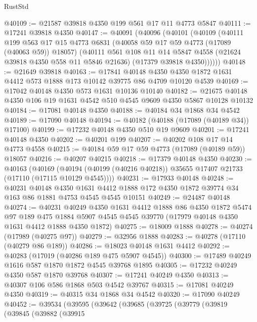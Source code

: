 \begin{lexlean}{RustStd}
\begin{coremodule}
@40109 := @21587 @39818 @4350 @199 @561 @17 @11 @4773 @5847
@40111 := @17241 @39818 @4350
@40147 := @40091
    (@40096
      (@40101
        (@40109
          (@40111
            @199
            @563
            @17
            @15
            @4773
            @6831
            (@40058 @59 @17 @59 @4773 (@17089 (@40063 @59)) @18057)
            (@40111
              @561
              @108
              @11
              @14
              @5847
              @4558
              (@21624 @39818 @4350 @558 @11 @5846 @21636)
              (@17379 @39818 @4350))))))
@40148 := @21649 @39818
@40163 := @17841
    @40148
    @4350
    @4350
    @1872
    @1631
    @4412
    @573
    @1888
    @173
    @10142
    @39775
    @86
    @4709
    @10120
    @4539
@40169 := @17042 @40148 @4350 @573 @1631 @10136 @10140
@40182 := @21675 @40148 @4350 @106 @19 @1631 @4542 @510 @4545 @9609 @4350 @5867 @10128 @10132
@40184 := @17081 @40148 @4350
@40188 := @40184 @34 @1868 @34 @4542
@40189 := @17090 @40148
@40194 := @40182 (@40188 (@17089 (@40189 @34)) @17100)
@40199 := @17232 @40148 @4350 @510 @19 @9609
@40201 := @17241 @40148 @4350
@40202 := @40201 @199
@40207 := @40202 @108 @17 @14 @4773 @4558
@40215 := @40184 @59 @17 @59 @4773 (@17089 (@40189 @59)) @18057
@40216 := @40207 @40215
@40218 := @17379 @40148 @4350
@40230 := @40163
    (@40169 (@40194 (@40199 (@40216 @40218)) @35655 @17407 @21733 (@17110 (@17115 @10129 @4545))))
@40231 := @17933 @40148
@40248 := @40231
    @40148
    @4350
    @1631
    @4412
    @1888
    @172
    @4350
    @1872
    @39774
    @34
    @163
    @86
    @1881
    @4753
    @4545
    @4545
    @10151
@40249 := @24487 @40148
@40274 := @40231
    @40249
    @4350
    @1631
    @4412
    @1888
    @86
    @4350
    @1872
    @5474
    @97
    @189
    @475
    @1884
    @5907
    @4545
    @4545
    @39770
    (@17979 @40148 @4350 @1631 @4412 @1888 @4350 @1872)
@40275 := @18009 @1888
@40278 := @40274 (@17989 (@40275 @97))
@40279 := @32956 @1888
@40283 := @40278 (@17110 (@40279 @86 @189))
@40286 := @18023 @40148 @1631 @4412
@40292 := @40283 (@17019 (@40286 @189 @475 @5907 @4545))
@40300 := @17489 @40249 @1616 @587 @1870 @1872 @4545 @39768 @1895
@40305 := @17232 @40249 @4350 @587 @1870 @39768
@40307 := @17241 @40249 @4350
@40313 := @40307 @106 @586 @1868 @503 @4542 @39767
@40315 := @17081 @40249 @4350
@40319 := @40315 @34 @1868 @34 @4542
@40320 := @17090 @40249
@40452 := @39534
    (@39595
      (@39642
        (@39685
          (@39725
            (@39779
              (@39819
                (@39845
                  (@39882
                    (@39915

\end{coremodule}
\end{lexlean}
